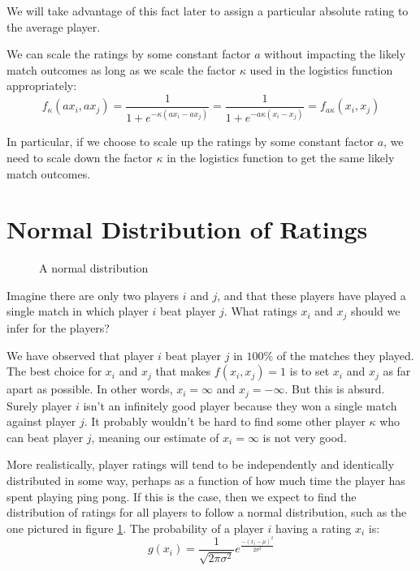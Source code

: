 \documentclass{article}
\begin{document}
We will take advantage of this fact later to assign a particular absolute
rating to the average player.

We can scale the ratings by some constant factor $a$ without impacting the
likely match outcomes as long as we scale the factor $\kappa$ used in the
logistics function appropriately:
\begin{equation*}
  f_\kappa(a x_i, a x_j) =
  \frac{1}{1 + e^{-\kappa(a x_i - a x_j)}} =
  \frac{1}{1 + e^{-a \kappa(x_i - x_j)}} = f_{a \kappa}(x_i, x_j)
\end{equation*}

In particular, if we choose to scale up the ratings by some constant factor
$a$, we need to scale down the factor $\kappa$ in the logistics function to
get the same likely match outcomes.

\section{Normal Distribution of Ratings}
\begin{figure}
  \caption{A normal distribution}
  \label{fig:normal}
 \end{figure}
Imagine there are only two players $i$ and $j$, and that these players have
played a single match in which player $i$ beat player $j$. What ratings $x_i$
and $x_j$ should we infer for the players?

We have observed that player $i$ beat player $j$ in $100\%$ of the matches
they played. The best choice for $x_i$ and $x_j$ that makes $f(x_i, x_j) = 1$
is to set $x_i$ and $x_j$ as far apart as possible. In other words,
$x_i = \infty$ and $x_j = -\infty$. But this is absurd. Surely player $i$
isn't an infinitely good player because they won a single match against player
$j$. It probably wouldn't be hard to find some other player $\kappa$ who can beat
player $j$, meaning our estimate of $x_i = \infty$ is not very good.

More realistically, player ratings will tend to be independently and
identically distributed in some way, perhaps as a function of how much time
the player has spent playing ping pong. If this is the case, then we expect to
find the distribution of ratings for all players to follow a normal
distribution, such as the one pictured in figure \ref{fig:normal}. The
probability of a player $i$ having a rating $x_i$ is:
\begin{equation}
  g(x_i) = \frac{1}{\sqrt{2\pi\sigma^2}} e^{\frac{-(x_i - \mu)^2}{2 \sigma^2}}
\end{equation}
\end{document}
